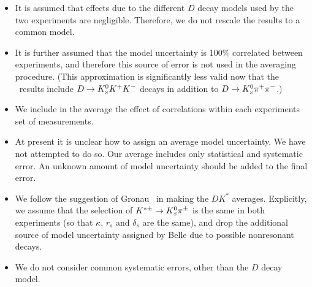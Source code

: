 \begin{itemize}\setlength{\itemsep}{0.5ex}
\item 
  It is assumed that effects due to the different $D$ decay models 
  used by the two experiments are negligible. 
  Therefore, we do not rescale the results to a common model.
\item 
  It is further assumed that the model uncertainty is $100\%$ 
  correlated between experiments, 
  and therefore this source of error is not used in the averaging procedure.
  (This approximation is significantly less valid now that the \babar\ results
  include $D \to K^0_{\scriptscriptstyle S} K^+K^-$ decays in addition to $D \to K^0_{\scriptscriptstyle S}\pi^+\pi^-$.)
\item 
  We include in the average the effect of correlations 
  within each experiments set of measurements.
\item 
  At present it is unclear how to assign an average model uncertainty. 
  We have not attempted to do so. 
  Our average includes only statistical and systematic error. 
  An unknown amount of model uncertainty should be added to the final error.
\item 
  We follow the suggestion of Gronau~\cite{Gronau:2002mu} 
  in making the $DK^*$ averages. 
  Explicitly, we assume that the selection of $K^{*\pm} \to K^0_{\scriptscriptstyle S}\pi^\pm$
  is the same in both experiments 
  (so that $\kappa$, $r_s$ and $\delta_s$ are the same), 
  and drop the additional source of model uncertainty 
  assigned by Belle due to possible nonresonant decays.
\item 
  We do not consider common systematic errors, 
  other than the $D$ decay model. 
\end{itemize}




